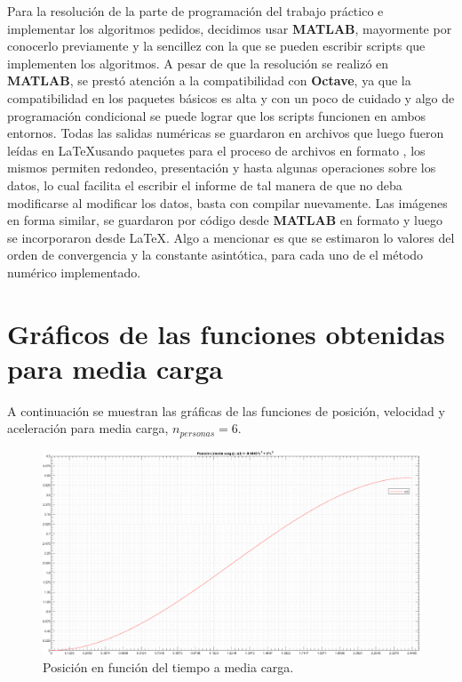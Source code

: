 Para la resolución de la parte de programación del trabajo práctico e implementar los algoritmos pedidos, decidimos usar \textbf{MATLAB}, mayormente por conocerlo previamente y la sencillez con la que se pueden escribir scripts que implementen los algoritmos. A pesar de que la resolución se realizó en \textbf{MATLAB}, se prestó atención a la compatibilidad con \textbf{Octave}, ya que la compatibilidad en los paquetes básicos es alta y con un poco de cuidado y algo de programación condicional se puede lograr que los scripts funcionen en ambos entornos.
Todas las salidas numéricas se guardaron en archivos que luego fueron leídas en \LaTeX\space usando paquetes para el proceso de archivos en formato \textbf{}, los mismos permiten redondeo, presentación y hasta algunas operaciones sobre los datos, lo cual facilita el escribir el informe de tal manera de que no deba modificarse al modificar los datos, basta con compilar nuevamente. Las imágenes en forma similar, se guardaron por código desde \textbf{MATLAB} en formato \textbf{} y luego se incorporaron desde \LaTeX. Algo a mencionar es que se estimaron lo valores del orden de convergencia y la constante asintótica, para cada uno de el método numérico implementado.





\section{Gráficos de las funciones obtenidas para media carga}

A continuación se muestran las gráficas de las funciones de posición, velocidad y aceleración para media carga, $n_{personas} = 6$.


\begin{figure}[!h] %
\begin{center}
\includegraphics[width=1.2 \textwidth, keepaspectratio=true, angle=90]{img/grafico_funcion_x.png} %
\caption{\label{fig:fig_position_n_2} \footnotesize{Posición en función del tiempo a media carga.}}
\end{center}
\end{figure}

